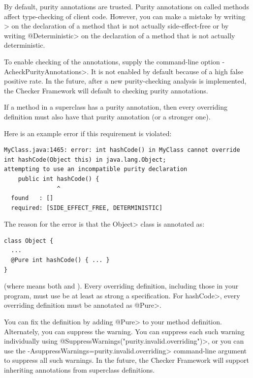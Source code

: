 By default, purity annotations are trusted.  Purity annotations on called
methods affect type-checking of client code.  However, you can make a
mistake by writing \<>
on the declaration of a method that
is not actually side-effect-free or by writing \<@Deterministic> on the
declaration of a method that is not actually deterministic.

To enable
checking of the annotations, supply the command-line option
\<-AcheckPurityAnnotations>.  It is not enabled by default because of a high false
positive rate.  In the future, after a new purity-checking analysis is
implemented, the Checker Framework will default to checking purity
annotations.



If a method in a superclass has a purity annotation, then every overriding
definition must also have that purity annotation (or a stronger one).

Here is an example error if this requirement is violated:

\begin{mysmall}
\begin{Verbatim}
MyClass.java:1465: error: int hashCode() in MyClass cannot override int hashCode(Object this) in java.lang.Object;
attempting to use an incompatible purity declaration
    public int hashCode() {
               ^
  found   : []
  required: [SIDE_EFFECT_FREE, DETERMINISTIC]
\end{Verbatim}
\end{mysmall}

\noindent
The reason for the error is that the \<Object> class is annotated as:

\begin{Verbatim}
class Object {
  ...
  @Pure int hashCode() { ... }
}
\end{Verbatim}

\noindent
(where  means both
 and
).  Every overriding
definition, including those in your program, must use be at least as strong
a specification.  For \<hashCode>, every overriding definition must be
annotated as \<@Pure>.

You can fix the definition by adding \<@Pure> to your method definition.
Alternately, you can suppress the warning.
You can suppress each such warning individually using
\<@SuppressWarnings("purity.invalid.overriding")>,
or you can use the \<-AsuppressWarnings=purity.invalid.overriding>
command-line argument to suppress all such warnings.
In the future, the Checker Framework will support inheriting annotations
from superclass definitions.


